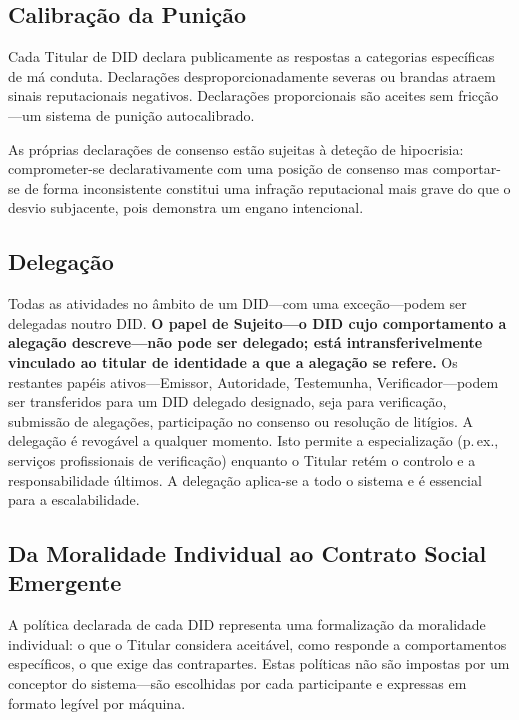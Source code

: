 \documentclass[11pt,a4paper,twocolumn]{article}
\begin{document}
\subsection{Calibração da Punição}

Cada Titular de DID declara publicamente as respostas a categorias específicas de má conduta. Declarações desproporcionadamente severas ou brandas atraem sinais reputacionais negativos. Declarações proporcionais são aceites sem fricção---um sistema de punição autocalibrado.

As próprias declarações de consenso estão sujeitas à deteção de hipocrisia: comprometer-se declarativamente com uma posição de consenso mas comportar-se de forma inconsistente constitui uma infração reputacional mais grave do que o desvio subjacente, pois demonstra um engano intencional.

\subsection{Delegação}

Todas as atividades no âmbito de um DID---com uma exceção---podem ser delegadas noutro DID. \textbf{O papel de Sujeito---o DID cujo comportamento a alegação descreve---não pode ser delegado; está intransferivelmente vinculado ao titular de identidade a que a alegação se refere.} Os restantes papéis ativos---Emissor, Autoridade, Testemunha, Verificador---podem ser transferidos para um DID delegado designado, seja para verificação, submissão de alegações, participação no consenso ou resolução de litígios. A delegação é revogável a qualquer momento. Isto permite a especialização (p.\,ex., serviços profissionais de verificação) enquanto o Titular retém o controlo e a responsabilidade últimos. A delegação aplica-se a todo o sistema e é essencial para a escalabilidade.

\subsection{Da Moralidade Individual ao Contrato Social Emergente}

A política declarada de cada DID representa uma formalização da moralidade individual: o que o Titular considera aceitável, como responde a comportamentos específicos, o que exige das contrapartes. Estas políticas não são impostas por um conceptor do sistema---são escolhidas por cada participante e expressas em formato legível por máquina.
\end{document}

